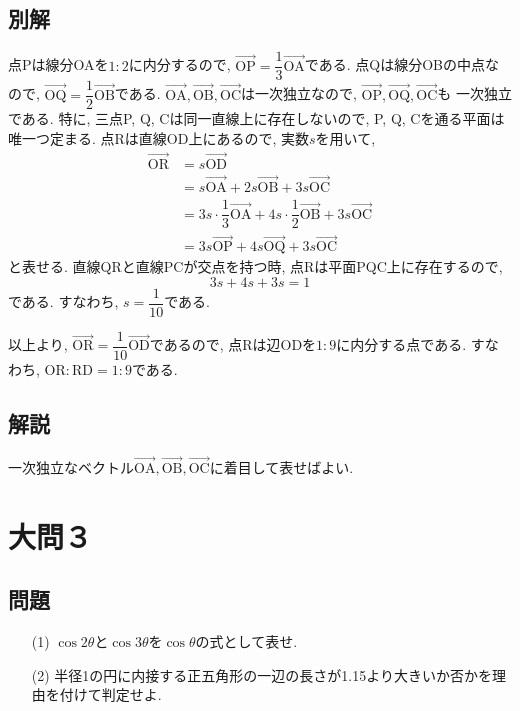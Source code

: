 \documentclass[dvipdfmx,a4paper]{jsarticle}
\newcommand{\posv}[1]{\overrightarrow{\mathrm{#1}}}
\newcommand{\2}{I\hspace{-1pt}I}
\newcommand{\3}{I\hspace{-1pt}I\hspace{-1pt}I}
\begin{document}
    \subsection{別解}
    点Pは線分OAを$1 : 2$に内分するので, $\posv{OP} = \dfrac{1}{3}\posv{OA}$である. 
    点Qは線分OBの中点なので, $\posv{OQ} = \dfrac{1}{2}\posv{OB}$である. 
    $\posv{OA}, \posv{OB}, \posv{OC}$は一次独立なので, $\posv{OP}, \posv{OQ}, \posv{OC}$も
    一次独立である. 特に, 三点P, Q, Cは同一直線上に存在しないので, P, Q, Cを通る平面は唯一つ定まる. 
    点Rは直線OD上にあるので, 実数$s$を用いて, 
    \begin{align*}
        \posv{OR} &= s \posv{OD} \\
        &= s\posv{OA} + 2s\posv{OB} + 3s\posv{OC} \\
        &= 3s \cdot \dfrac{1}{3}\posv{OA} + 4s \cdot \dfrac{1}{2}\posv{OB} + 3s\posv{OC} \\
        &= 3s \posv{OP} + 4s\posv{OQ} + 3s\posv{OC}
    \end{align*}
    と表せる. 直線QRと直線PCが交点を持つ時, 点Rは平面PQC上に存在するので, 
    \begin{equation*}
        3s + 4s + 3s = 1
    \end{equation*}
    である. すなわち, $s = \dfrac{1}{10}$である. 

    以上より, $\posv{OR} =  \dfrac{1}{10}\posv{OD}$であるので, 点Rは辺ODを$1:9$に内分する点である. 
    すなわち, $\mathrm{OR} : \mathrm{RD} = 1:9$である. 
    
    \subsection{解説}
    一次独立なベクトル$\posv{OA},\posv{OB},\posv{OC}$に着目して表せばよい. 

    \section{大問３}
    \subsection{問題}
    \begin{itemize}
        \item [(1)] $\cos 2\theta$と$\cos 3\theta$を$\cos \theta$の式として表せ. 
        \item [(2)] 半径1の円に内接する正五角形の一辺の長さが1.15より大きいか否かを理由を付けて判定せよ. 
    \end{itemize}
\end{document}
